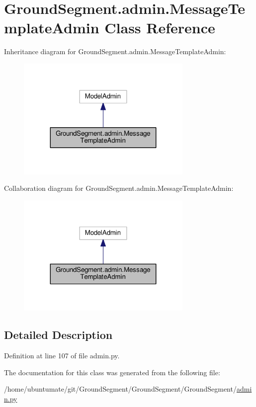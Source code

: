 \hypertarget{class_ground_segment_1_1admin_1_1_message_template_admin}{}\section{Ground\+Segment.\+admin.\+Message\+Template\+Admin Class Reference}
\label{class_ground_segment_1_1admin_1_1_message_template_admin}


Inheritance diagram for Ground\+Segment.\+admin.\+Message\+Template\+Admin\+:\nopagebreak
\begin{figure}[H]
\begin{center}
\leavevmode
\includegraphics[width=239pt]{class_ground_segment_1_1admin_1_1_message_template_admin__inherit__graph}
\end{center}
\end{figure}


Collaboration diagram for Ground\+Segment.\+admin.\+Message\+Template\+Admin\+:\nopagebreak
\begin{figure}[H]
\begin{center}
\leavevmode
\includegraphics[width=239pt]{class_ground_segment_1_1admin_1_1_message_template_admin__coll__graph}
\end{center}
\end{figure}


\subsection{Detailed Description}


Definition at line 107 of file admin.\+py.



The documentation for this class was generated from the following file\+:\begin{DoxyCompactItemize}
\item 
/home/ubuntumate/git/\+Ground\+Segment/\+Ground\+Segment/\+Ground\+Segment/\hyperlink{admin_8py}{admin.\+py}\end{DoxyCompactItemize}
